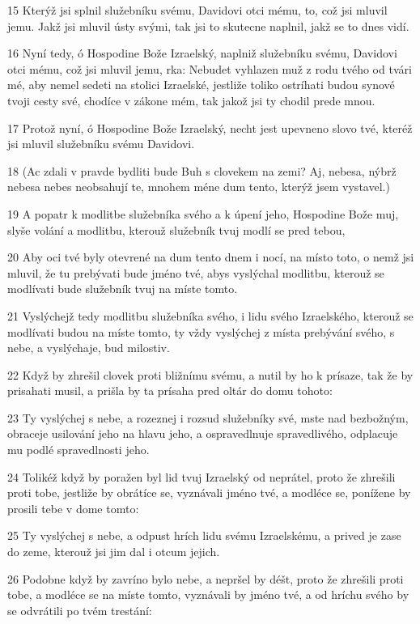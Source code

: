 \par 15 Kterýž jsi splnil služebníku svému, Davidovi otci mému, to, což jsi mluvil jemu. Jakž jsi mluvil ústy svými, tak jsi to skutecne naplnil, jakž se to dnes vidí.
\par 16 Nyní tedy, ó Hospodine Bože Izraelský, naplniž služebníku svému, Davidovi otci mému, což jsi mluvil jemu, rka: Nebudet vyhlazen muž z rodu tvého od tvári mé, aby nemel sedeti na stolici Izraelské, jestliže toliko ostríhati budou synové tvoji cesty své, chodíce v zákone mém, tak jakož jsi ty chodil prede mnou.
\par 17 Protož nyní, ó Hospodine Bože Izraelský, necht jest upevneno slovo tvé, kteréž jsi mluvil služebníku svému Davidovi.
\par 18 (Ac zdali v pravde bydliti bude Buh s clovekem na zemi? Aj, nebesa, nýbrž nebesa nebes neobsahují te, mnohem méne dum tento, kterýž jsem vystavel.)
\par 19 A popatr k modlitbe služebníka svého a k úpení jeho, Hospodine Bože muj, slyše volání a modlitbu, kterouž služebník tvuj modlí se pred tebou,
\par 20 Aby oci tvé byly otevrené na dum tento dnem i nocí, na místo toto, o nemž jsi mluvil, že tu prebývati bude jméno tvé, abys vyslýchal modlitbu, kterouž se modlívati bude služebník tvuj na míste tomto.
\par 21 Vyslýchejž tedy modlitbu služebníka svého, i lidu svého Izraelského, kterouž se modlívati budou na míste tomto, ty vždy vyslýchej z místa prebývání svého, s nebe, a vyslýchaje, bud milostiv.
\par 22 Když by zhrešil clovek proti bližnímu svému, a nutil by ho k prísaze, tak že by prisahati musil, a prišla by ta prísaha pred oltár do domu tohoto:
\par 23 Ty vyslýchej s nebe, a rozeznej i rozsud služebníky své, mste nad bezbožným, obraceje usilování jeho na hlavu jeho, a ospravedlnuje spravedlivého, odplacuje mu podlé spravedlnosti jeho.
\par 24 Tolikéž když by poražen byl lid tvuj Izraelský od neprátel, proto že zhrešili proti tobe, jestliže by obrátíce se, vyznávali jméno tvé, a modléce se, ponížene by prosili tebe v dome tomto:
\par 25 Ty vyslýchej s nebe, a odpust hrích lidu svému Izraelskému, a prived je zase do zeme, kterouž jsi jim dal i otcum jejich.
\par 26 Podobne když by zavríno bylo nebe, a nepršel by déšt, proto že zhrešili proti tobe, a modléce se na míste tomto, vyznávali by jméno tvé, a od hríchu svého by se odvrátili po tvém trestání:
